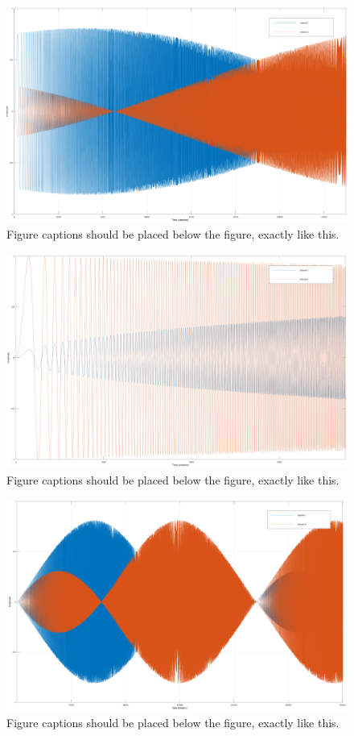 \documentclass{article}
\begin{document}
\begin{figure}[t]
\centering
\includegraphics[width=1\columnwidth]{MS2LR-90deg}
\caption{Figure captions should be placed below the figure,
exactly like this.\label{fig:example}}
\end{figure}

\begin{figure}[t]
\centering
\includegraphics[width=1\columnwidth]{SQRT-LR}
\caption{Figure captions should be placed below the figure,
exactly like this.\label{fig:example}}
\end{figure}

\begin{figure}[t]
\centering
\includegraphics[width=1\columnwidth]{MS2LR-180deg-1}
\caption{Figure captions should be placed below the figure,
exactly like this.\label{fig:example}}
\end{figure}
\end{document}
